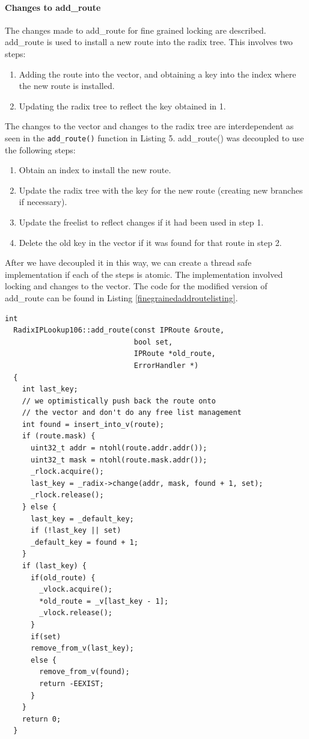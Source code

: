 \documentclass[12pt,a4paper]{article}
\begin{document}
\paragraph{Changes to add\_route}
The changes made to add\_route for fine grained locking are described.
add\_route is used to install a new route into the radix tree. This involves two steps:
\begin{enumerate}
\item Adding the route into the vector, and obtaining a key into the index where the new route is installed.
\item Updating the radix tree to reflect the key obtained in 1.
\end{enumerate}
The changes to the vector and changes to the radix tree are interdependent as seen in the \verb+add_route()+ function in Listing 5.
add\_route() was decoupled to use the following steps:
\begin{enumerate}
\item  Obtain an index to install the new route.
\item Update the radix tree with the key for the new route 
(creating new branches if necessary).
\item Update the freelist to reflect changes if it had been used in step 1.
\item Delete the old key in the vector if it was found for that route in step 2.
\end{enumerate}
After we have decoupled it in this way, we can create a thread safe implementation if each of the steps is atomic. The implementation involved locking and changes to the vector. The code for the modified version of add\_route can be found in Listing \ref{finegrainedaddroutelisting}.
\begin{lstlisting}[caption=Fine-grained add\_route(), label=finegrainedaddroutelisting,float=tph]
  int
  RadixIPLookup106::add_route(const IPRoute &route, 
                              bool set, 
                              IPRoute *old_route, 
                              ErrorHandler *)
  {
    int last_key;
    // we optimistically push back the route onto
    // the vector and don't do any free list management
    int found = insert_into_v(route);
    if (route.mask) {
      uint32_t addr = ntohl(route.addr.addr());
      uint32_t mask = ntohl(route.mask.addr());
      _rlock.acquire();
      last_key = _radix->change(addr, mask, found + 1, set);
      _rlock.release();
    } else {
      last_key = _default_key;
      if (!last_key || set)
      _default_key = found + 1;
    }
    if (last_key) { 
      if(old_route) { 
        _vlock.acquire();
        *old_route = _v[last_key - 1];
        _vlock.release();
      }
      if(set)
      remove_from_v(last_key);
      else {
        remove_from_v(found);
        return -EEXIST;
      }
    }
    return 0;
  }
\end{lstlisting}
\end{document}

